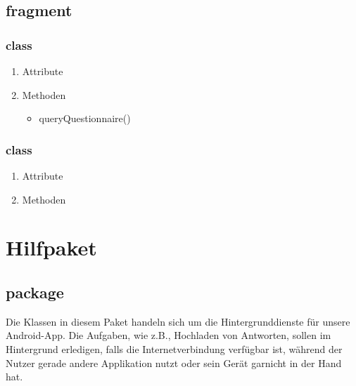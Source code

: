 \documentclass[a4paper]{scrreprt}
\begin{document}
            \subsection{fragment}

                \subsubsection{class }
                \begin{enumerate}
                \item Attribute
                \item Methoden
                     \begin{itemize}
                                \item queryQuestionnaire()
                     \end{itemize}
                \end{enumerate}

                \subsubsection{class }
                 \begin{enumerate}
                        \item Attribute
                        \item Methoden
                \end{enumerate}


        \newpage
        \section{Hilfpaket}


            \subsection{package }

                Die Klassen in diesem Paket handeln sich um die Hintergrunddienste für unsere Android-App. Die Aufgaben, wie z.B., Hochladen von Antworten, sollen im Hintergrund erledigen, falls die Internetverbindung verfügbar ist, während der Nutzer gerade andere Applikation nutzt oder sein Gerät garnicht in der Hand hat.
\end{document}

